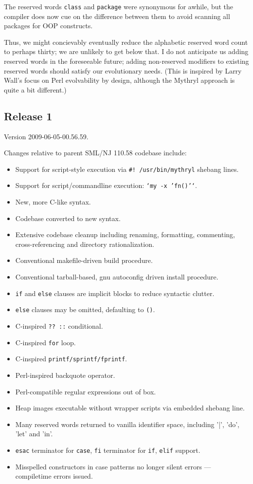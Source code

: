 The reserved words {\tt class} and {\tt package} were synonymous for 
awhile, but the compiler does now cue on the difference between them 
to avoid scanning all packages for OOP constructs.

Thus, we might concievably eventually reduce the alphabetic reserved 
word count to perhaps thirty; we are unlikely to get below that.  I do 
not anticipate us adding reserved words in the foreseeable future; 
adding non-reserved modifiers to existing reserved words should 
satisfy our evolutionary needs.  (This is inspired by Larry Wall's 
focus on Perl evolvability by design, although the Mythryl 
approach is quite a bit different.)

\cutend*


\subsection{Release 1}
\label{section:src:release-1}

Version 2009-06-05-00.56.59.

Changes relative to parent {\sc SML/NJ} 110.58 codebase include:
\begin{itemize}
\item Support for script-style execution via {\tt#! /usr/bin/mythryl} shebang lines.
\item Support for script/commandline execution: {\tt `my -x 'fn()'`}.
\item New, more C-like syntax.
\item Codebase converted to new syntax.
\item Extensive codebase cleanup including renaming, formatting, commenting, cross-referencing and directory rationalization.
\item Conventional makefile-driven build procedure.
\item Conventional tarball-based, gnu autoconfig driven install procedure.
\item {\tt if} and {\tt else} clauses are implicit blocks to reduce syntactic clutter.
\item {\tt else} clauses may be omitted, defaulting to {\tt ()}.
\item C-inspired {\tt ?? ::} conditional.
\item C-inspired {\tt for} loop.
\item C-inspired {\tt printf/sprintf/fprintf}.
\item Perl-inspired backquote operator.
\item Perl-compatible regular expressions out of box.
\item Heap images executable without wrapper scripts via embedded shebang line.
\item Many reserved words returned to vanilla identifier space, including '|', 'do', 'let' and 'in'.
\item {\tt esac} terminator for {\tt case}, {\tt fi} terminator for {\tt if}, {\tt elif} support.
\item Misspelled constructors in case patterns no longer silent errors --- compiletime errors issued.
\end{itemize}

\cutend*

